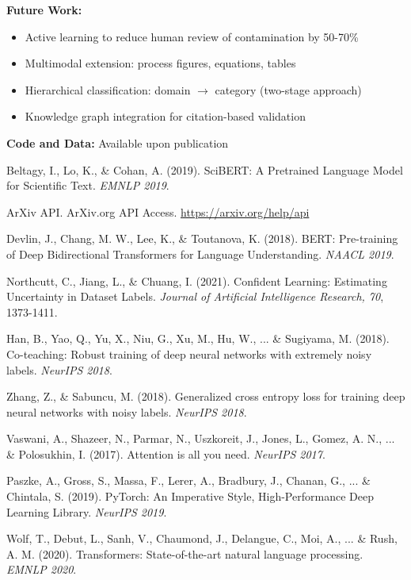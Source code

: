 \documentclass{article}
\begin{document}
\textbf{Future Work:}
\begin{itemize}
    \item Active learning to reduce human review of contamination by 50-70\%
    \item Multimodal extension: process figures, equations, tables
    \item Hierarchical classification: domain $\rightarrow$ category (two-stage approach)
    \item Knowledge graph integration for citation-based validation
\end{itemize}

\textbf{Code and Data:} Available upon publication


\begin{thebibliography}{9}

Beltagy, I., Lo, K., \& Cohan, A. (2019).
SciBERT: A Pretrained Language Model for Scientific Text.
\emph{EMNLP 2019}.

ArXiv API. ArXiv.org API Access. \url{https://arxiv.org/help/api}

Devlin, J., Chang, M. W., Lee, K., \& Toutanova, K. (2018).
BERT: Pre-training of Deep Bidirectional Transformers for Language Understanding.
\emph{NAACL 2019}.

Northcutt, C., Jiang, L., \& Chuang, I. (2021).
Confident Learning: Estimating Uncertainty in Dataset Labels.
\emph{Journal of Artificial Intelligence Research, 70}, 1373-1411.

Han, B., Yao, Q., Yu, X., Niu, G., Xu, M., Hu, W., ... \& Sugiyama, M. (2018).
Co-teaching: Robust training of deep neural networks with extremely noisy labels.
\emph{NeurIPS 2018}.

Zhang, Z., \& Sabuncu, M. (2018).
Generalized cross entropy loss for training deep neural networks with noisy labels.
\emph{NeurIPS 2018}.

Vaswani, A., Shazeer, N., Parmar, N., Uszkoreit, J., Jones, L., Gomez, A. N., ... \& Polosukhin, I. (2017).
Attention is all you need.
\emph{NeurIPS 2017}.

Paszke, A., Gross, S., Massa, F., Lerer, A., Bradbury, J., Chanan, G., ... \& Chintala, S. (2019).
PyTorch: An Imperative Style, High-Performance Deep Learning Library.
\emph{NeurIPS 2019}.

Wolf, T., Debut, L., Sanh, V., Chaumond, J., Delangue, C., Moi, A., ... \& Rush, A. M. (2020).
Transformers: State-of-the-art natural language processing.
\emph{EMNLP 2020}.

\end{thebibliography}
\end{document}
